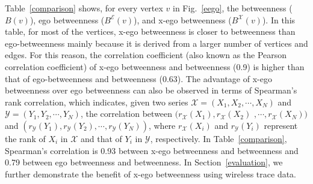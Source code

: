 \documentclass[preprint,12pt,authoryear]{elsarticle}
\newcommand{\B}[1]{B({#1})}
\newcommand{\BE}[1]{B^{\mathcal{E}}({#1})}
\newcommand{\BX}[1]{B^{\mathcal{X}}({#1})}
\theoremstyle{definition}
\begin{document}


Table~\ref{comparison} shows, for every vertex $v$ in Fig.~\ref{eego}, the betweenness ($\B{v}$), ego betweenness ($\BE{v}$), and x-ego betweenness ($\BX{v}$).
In this table, for most of the vertices, x-ego betweenness is closer to betweenness than ego-betweenness mainly because it is derived from a larger number of vertices and edges.
For this reason, the correlation coefficient (also known as the Pearson correlation coefficient) of x-ego betweenness and betweenness (0.9) is higher than that of ego-betweenness and betweenness (0.63).
The advantage of x-ego betweenness over ego betweenness can also be observed in terms of Spearman's rank correlation, which indicates, given two series $\mathcal{X}=(X_1, X_2, \cdots, X_N)$ and $\mathcal{Y}=(Y_1, Y_2, \cdots, Y_N)$, the correlation between $(r_{\mathcal{X}}(X_1), r_{\mathcal{X}}(X_2)$ $, \cdots, r_{\mathcal{X}}(X_N))$ and $(r_{\mathcal{Y}}(Y_1), r_{\mathcal{Y}}(Y_2), \cdots, r_{\mathcal{Y}}(Y_N))$, where $r_{\mathcal{X}}(X_i)$ and $r_{\mathcal{Y}}(Y_i)$ represent the rank of $X_i$ in $\mathcal{X}$ and that of $Y_i$ in $\mathcal{Y}$, respectively.
In Table~\ref{comparison}, Spearman's correlation is 0.93 between x-ego betweenness and betweenness and 0.79 between ego betweenness and betweenness.
In Section~\ref{evaluation}, we further demonstrate the benefit of x-ego betweenness using wireless trace data.
\end{document}
